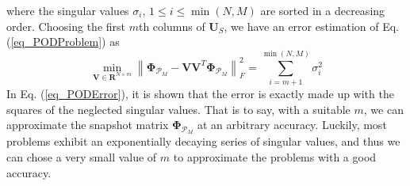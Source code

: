 \documentclass[preprint, 10pt]{elsarticle}
\begin{document}
where  the singular values $\sigma _i$, $1 \le i \le \min(N,M)$ are sorted in a decreasing order. Choosing the first $m$th columns of
 $\mathbf{U}_S$, we have an error estimation of Eq. (\ref{eq_PODProblem}) as
 \begin{equation}
 \mathop {\min}\limits_{\mathbf{V} \in \mathbf{R}^{N\times m}}
\left\| {\pmb {\Phi}_{\mathcal{P}_M} - \mathbf{V}\mathbf{V}^T \pmb {\Phi}_{\mathcal{P}_M}} \right\|_{F}^{2}
=\sum_{i=m+1}^{\min(N,M)} \sigma _{i}^{2}
\label{eq_PODError}
 \end{equation}
In Eq. (\ref{eq_PODError}), it is shown that the error is exactly made up with  the squares of the neglected singular values. That is to say, with a suitable $m$, we can approximate the snapshot matrix $\pmb {\Phi}_{\mathcal{P}_M}$ at an arbitrary accuracy.  Luckily, most problems exhibit an exponentially decaying series of singular values, and thus we can chose a very small value of $m$ to approximate the problems with a good accuracy.
\end{document}
